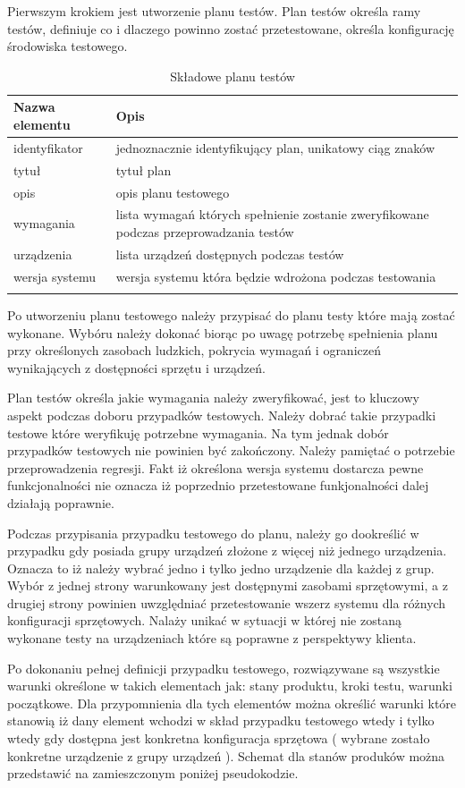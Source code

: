 Pierwszym krokiem jest utworzenie planu testów. Plan testów określa ramy testów, definiuje co i dlaczego powinno zostać przetestowane, określa konfigurację środowiska testowego.

\begin{longtable}{| p{6cm}  | p{10cm} |}
 \hline \hline
\textbf{Nazwa elementu} & \textbf{Opis}  \\ \hline
  identyfikator & jednoznacznie identyfikujący plan, unikatowy ciąg znaków \\ \hline
  tytuł & tytuł plan \\ \hline
  opis & opis planu testowego \\ \hline
  wymagania & lista wymagań których spełnienie zostanie zweryfikowane podczas przeprowadzania testów \\ \hline
  urządzenia & lista urządzeń dostępnych podczas testów \\ \hline
  wersja systemu & wersja systemu która będzie wdrożona podczas testowania  \\ \hline
 \caption{ Składowe planu testów}
\end{longtable}

Po utworzeniu planu testowego należy przypisać do planu testy które mają zostać wykonane. Wybóru należy dokonać biorąc po uwagę potrzebę spełnienia planu przy określonych zasobach ludzkich, pokrycia wymagań i ograniczeń wynikających z dostępności sprzętu i urządzeń.

Plan testów określa jakie wymagania należy zweryfikować, jest to kluczowy aspekt podczas doboru przypadków testowych. Należy dobrać takie przypadki testowe które weryfikuję potrzebne wymagania. Na tym jednak dobór przypadków testowych nie powinien być zakończony. Należy pamiętać o potrzebie przeprowadzenia regresji. Fakt iż określona wersja systemu dostarcza pewne funkcjonalności nie oznacza iż poprzednio przetestowane funkjonalności dalej działają poprawnie.

Podczas przypisania przypadku testowego do planu, należy go dookreślić w przypadku gdy posiada grupy urządzeń złożone z więcej niż jednego urządzenia. Oznacza to iż należy wybrać jedno i tylko jedno urządzenie dla każdej z grup. Wybór z jednej strony warunkowany jest dostępnymi zasobami sprzętowymi, a z drugiej strony powinien uwzględniać przetestowanie wszerz systemu dla różnych konfiguracji sprzętowych. Nalaży unikać w sytuacji w której nie zostaną wykonane testy na urządzeniach które są poprawne z perspektywy klienta.

Po dokonaniu pełnej definicji przypadku testowego, rozwiązywane są wszystkie warunki określone w takich elementach jak: stany produktu, kroki testu, warunki początkowe. Dla przypomnienia dla tych elementów można określić warunki które stanowią iż dany element wchodzi w skład przypadku testowego wtedy i tylko wtedy gdy dostępna jest konkretna konfiguracja sprzętowa ( wybrane zostało konkretne urządzenie z grupy urządzeń ). Schemat dla stanów produków można przedstawić na zamieszczonym poniżej pseudokodzie.

